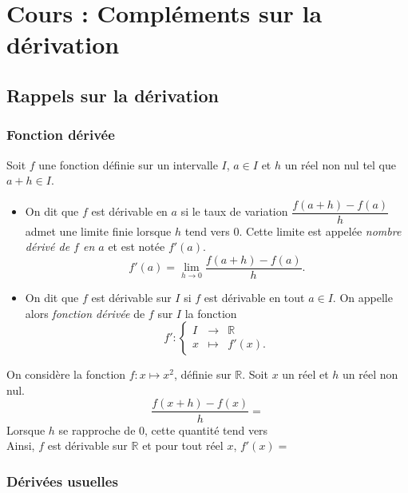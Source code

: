 \documentclass[11pt,fleqn, openany]{book} %
\begin{document}
\chapter{Cours : Compléments sur la dérivation}

\section{Rappels sur la dérivation}

\subsection{Fonction dérivée}

\begin{definition}Soit $f$ une fonction définie sur un intervalle $I$, $a\in I$ et $h$ un réel non nul tel que $a+h \in I$. 

\begin{itemize}
\item On dit que $f$ est dérivable en $a$ si le taux de variation $\dfrac{f(a+h)-f(a)}{h}$ admet une limite finie lorsque $h$ tend vers 0. Cette limite est appelée \textit{nombre dérivé de $f$ en $a$ }et est notée $f'(a)$.
\[ f'(a)=\lim_{h \to 0} \dfrac{f(a+h)-f(a)}{h}. \]
\item On dit que $f$ est dérivable sur $I$ si $f$ est dérivable en tout $a\in I$. On appelle alors \textit{fonction dérivée} de $f$ sur $I$ la fonction
\[f' : \left\{ \begin{array}{rcl}
I & \longrightarrow & \mathbb{R}\\
x & \longmapsto & f'(x).
\end{array}\right.\]\end{itemize}\end{definition}

\begin{example}On considère la fonction $f : x \mapsto x^2$, définie sur $\mathbb{R}$. Soit $x$ un réel et $h$ un réel non nul.
\[ \dfrac{f(x+h)-f(x)}{h}=\]
Lorsque $h$ se rapproche de 0, cette quantité tend vers \\Ainsi, $f$ est dérivable sur $\mathbb{R}$ et pour tout réel $x$, $f'(x)=$\end{example}

\subsection{Dérivées usuelles}
\end{document}
